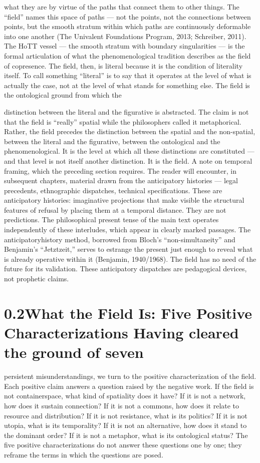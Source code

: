 what they are by virtue of the paths that connect them to other things. The “field” names this space of paths — not the points, not the connections between points, but the smooth stratum within which paths are continuously deformable into one another (The Univalent Foundations Program, 2013; Schreiber, 2011). The HoTT vessel — the smooth stratum with boundary singularities — is the formal articulation of what the phenomenological tradition describes as the field of copresence. The field, then, is literal because it is the condition of literality itself. To call something “literal” is to say that it operates at the level of what is actually the case, not at the level of what stands for something else. The field is the ontological ground from which the

distinction between the literal and the figurative is abstracted. The claim is not that the field is “really” spatial while the philosophers called it metaphorical. Rather, the field precedes the distinction between the spatial and the non-spatial, between the literal and the figurative, between the ontological and the phenomenological. It is the level at which all these distinctions are constituted — and that level is not itself another distinction. It is the field. A note on temporal framing, which the preceding section requires. The reader will encounter, in subsequent chapters, material drawn from the anticipatory histories — legal precedents, ethnographic dispatches, technical specifications. These are anticipatory histories: imaginative projections that make visible the structural features of refusal by placing them at a temporal distance. They are not predictions. The philosophical present tense of the main text operates independently of these interludes, which appear in clearly marked passages. The anticipatoryhistory method, borrowed from Bloch’s “non-simultaneity” and Benjamin’s “Jetztzeit,” serves to estrange the present just enough to reveal what is already operative within it (Benjamin, 1940/1968). The field has no need of the future for its validation. These anticipatory dispatches are pedagogical devices, not prophetic claims.

\section{0.2\quad What the Field Is: Five Positive Characterizations Having cleared the ground of seven}

persistent misunderstandings, we turn to the positive characterization of the field. Each positive claim answers a question raised by the negative work. If the field is not containerspace, what kind of spatiality does it have? If it is not a network, how does it sustain connection? If it is not a commons, how does it relate to resource and distribution? If it is not resistance, what is its politics? If it is not utopia, what is its temporality? If it is not an alternative, how does it stand to the dominant order? If it is not a metaphor, what is its ontological status? The five positive characterizations do not answer these questions one by one; they reframe the terms in which the questions are posed.

